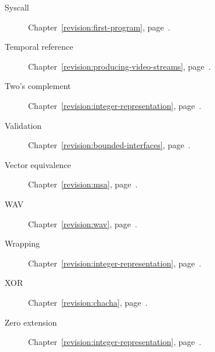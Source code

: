 \begin{description}
  \item[Syscall] Chapter~\ref{revision:first-program}, page~\pageref{revision:first-program}.
  \item[Temporal reference] Chapter~\ref{revision:producing-video-streams}, page~\pageref{revision:producing-video-streams}.
  \item[Two's complement] Chapter~\ref{revision:integer-representation}, page~\pageref{revision:integer-representation}.
  \item[Validation] Chapter~\ref{revision:bounded-interfaces}, page~\pageref{revision:bounded-interfaces}.
  \item[Vector equivalence] Chapter~\ref{revision:msa}, page~\pageref{revision:msa}.
  \item[WAV] Chapter~\ref{revision:wav}, page~\pageref{revision:wav}.
  \item[Wrapping] Chapter~\ref{revision:integer-representation}, page~\pageref{revision:integer-representation}.
  \item[XOR] Chapter~\ref{revision:chacha}, page~\pageref{revision:chacha}.
  \item[Zero extension] Chapter~\ref{revision:integer-representation}, page~\pageref{revision:integer-representation}.
\end{description}
